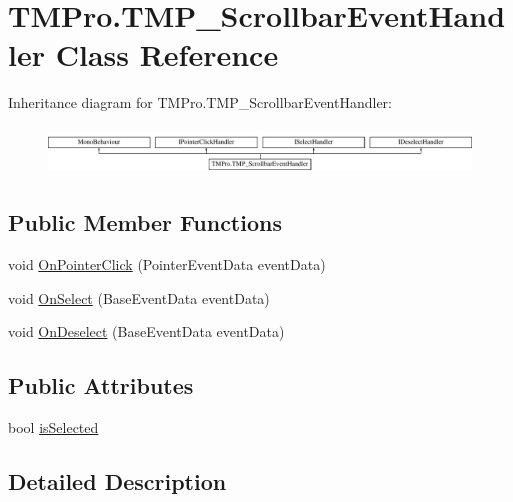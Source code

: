\hypertarget{class_t_m_pro_1_1_t_m_p___scrollbar_event_handler}{}\section{T\+M\+Pro.\+T\+M\+P\+\_\+\+Scrollbar\+Event\+Handler Class Reference}
\label{class_t_m_pro_1_1_t_m_p___scrollbar_event_handler}
Inheritance diagram for T\+M\+Pro.\+T\+M\+P\+\_\+\+Scrollbar\+Event\+Handler\+:\begin{figure}[H]
\begin{center}
\leavevmode
\includegraphics[height=1.250000cm]{class_t_m_pro_1_1_t_m_p___scrollbar_event_handler}
\end{center}
\end{figure}
\subsection*{Public Member Functions}
\begin{DoxyCompactItemize}
\item 
void \mbox{\hyperlink{class_t_m_pro_1_1_t_m_p___scrollbar_event_handler_a9138b07ac7dd5c6cd516bc439d7dcafc}{On\+Pointer\+Click}} (Pointer\+Event\+Data event\+Data)
\item 
void \mbox{\hyperlink{class_t_m_pro_1_1_t_m_p___scrollbar_event_handler_a92c7d93261888c79e1605b7944238e8d}{On\+Select}} (Base\+Event\+Data event\+Data)
\item 
void \mbox{\hyperlink{class_t_m_pro_1_1_t_m_p___scrollbar_event_handler_ab977fc6cdcb5dbd676e38fb5771d64e3}{On\+Deselect}} (Base\+Event\+Data event\+Data)
\end{DoxyCompactItemize}
\subsection*{Public Attributes}
\begin{DoxyCompactItemize}
\item 
bool \mbox{\hyperlink{class_t_m_pro_1_1_t_m_p___scrollbar_event_handler_a32cdf09d2c7ad284a60debb41a35600d}{is\+Selected}}
\end{DoxyCompactItemize}


\subsection{Detailed Description}


